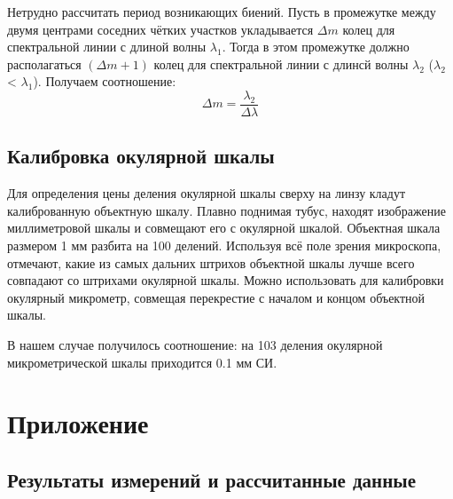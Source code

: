 \documentclass[a4paper, 12pt]{article}
\begin{document}
Нетрудно рассчитать период возникающих биений. Пусть в промежутке между двумя центрами соседних чётких участков укладывается $\Delta m$ колец для спектральной линии с длиной волны $\lambda_1$. Тогда в этом промежутке должно располагаться $(\Delta m + 1)$ колец для спектральной линии с длинсй волны $\lambda_2$ ($\lambda_2$ < $\lambda_1$). Получаем соотношение:
\[
\Delta m= \frac{\lambda_2}{\Delta \lambda}
\]

\subsection*{Калибровка окулярной шкалы}

Для определения цены деления окулярной шкалы сверху на линзу кладут калиброванную объектную шкалу. Плавно поднимая тубус, находят изображение миллиметровой шкалы и совмещают его с окулярной шкалой.
Объектная шкала размером 1 мм разбита на 100 делений. Используя всё поле зрения микроскопа, отмечают, какие из самых дальних штрихов объектной шкалы лучше всего совпадают со штрихами окулярной шкалы. Можно использовать для калибровки окулярный микрометр, совмещая перекрестие с началом и концом объектной шкалы.

В нашем случае получилось соотношение: на 103 деления окулярной  микрометрической шкалы приходится 0.1 мм СИ.

\newpage
\section*{Приложение}
\subsection*{Результаты измерений и рассчитанные данные}

\end{document}
